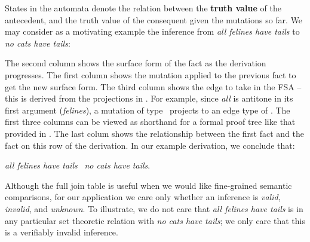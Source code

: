 States in the automata denote the relation between the
  \textbf{truth value} of
  the antecedent, and the truth value of the consequent given the
  mutations so far.
We may consider as a motivating example the inference from
  \textit{all felines have tails} to \textit{no cats have tails}:

\vspace{1em}
\noindent{}
\vspace{1em}

The second column shows the surface form of the fact as the derivation
  progresses.
The first column shows the mutation applied to the previous fact to get
  the new surface form.
The third column shows the edge to take in the FSA -- this is derived
  from the projections in .
For example, since \textit{all} is antitone in its first argument
  (\textit{felines}), a mutation of type \reverse\ projects to an edge
  type of \forward.
The first three columns can be viewed as shorthand for a
  formal proof tree like that provided in .
The last colum shows the relationship between the first fact
  and the fact on this row of the derivation.
In our example derivation, we conclude that:

\begin{center}
  \textit{all felines have tails}
  \alternate\ \textit{no cats have tails}.
\end{center}

%
%
Although the full join table is useful when we would like fine-grained
  semantic comparisons, for our application we care only whether
  an inference is \textit{valid}, \textit{invalid}, and \textit{unknown}.
To illustrate, we do not care that \textit{all felines have tails}
  is in any particular set theoretic relation with
  \textit{no cats have tails}; we only care that this is a verifiably
  invalid inference.

